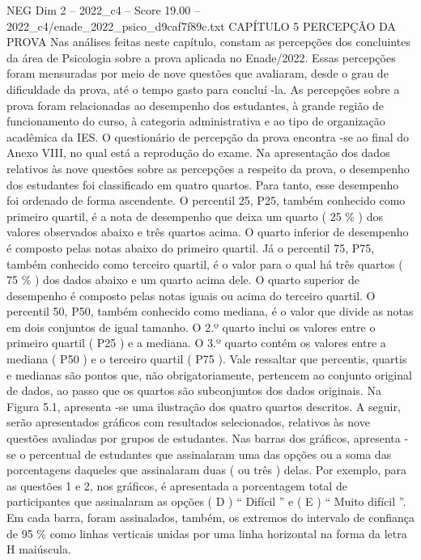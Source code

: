\begin{textsample}{NEG Dim 2 – 2022\_c4 – Score 19.00 – 2022\_c4/enade\_2022\_psico\_d9caf7f89c.txt}  \label{ex:f2_neg_409}
CAPÍTULO 5 PERCEPÇÃO DA PROVA Nas análises feitas neste capítulo, constam as percepções dos concluintes da área de Psicologia sobre a prova aplicada no Enade/2022.
Essas percepções foram mensuradas por meio de nove questões que avaliaram, desde o grau de dificuldade da prova, até o tempo gasto para concluí -la.
As percepções sobre a prova foram relacionadas ao desempenho dos estudantes, à grande região de funcionamento do curso, à categoria administrativa e ao tipo de organização acadêmica da IES.
O questionário de percepção da prova encontra -se ao final do Anexo VIII, no qual está a reprodução do exame.
Na apresentação dos dados relativos às nove questões sobre as percepções a respeito da prova, o desempenho dos estudantes foi classificado em quatro quartos.
Para tanto, esse desempenho foi ordenado de forma ascendente.
O percentil 25, P25, também conhecido como primeiro quartil, é a nota de desempenho que deixa um quarto ( 25 \% ) dos valores observados abaixo e três quartos acima.
O quarto inferior de desempenho é composto pelas notas abaixo do primeiro quartil.
Já o percentil 75, P75, também conhecido como terceiro quartil, é o valor para o qual há três quartos ( 75 \% ) dos dados abaixo e um quarto acima dele.
O quarto superior de desempenho é composto pelas notas iguais ou acima do terceiro quartil.
O percentil 50, P50, também conhecido como mediana, é o valor que divide as notas em dois conjuntos de igual tamanho.
O 2.º quarto inclui os valores entre o primeiro quartil ( P25 ) e a mediana.
O 3.º quarto contém os valores entre a mediana ( P50 ) e o terceiro quartil ( P75 ).
Vale ressaltar que percentis, quartis e medianas são pontos que, não obrigatoriamente, pertencem ao conjunto original de dados, ao passo que os quartos são subconjuntos dos dados originais.
Na Figura 5.1, apresenta -se uma ilustração dos quatro quartos descritos.
A seguir, serão apresentados gráficos com resultados selecionados, relativos às nove questões avaliadas por grupos de estudantes.
Nas barras dos gráficos, apresenta -se o percentual de estudantes que assinalaram uma das opções ou a soma das porcentagens daqueles que assinalaram duas ( ou três ) delas.
Por exemplo, para as questões 1 e 2, nos gráficos, é apresentada a porcentagem total de participantes que assinalaram as opções ( D ) “ Difícil ” e ( E ) “ Muito difícil ”.
Em cada barra, foram assinalados, também, os extremos do intervalo de confiança de 95 \% como linhas verticais unidas por uma linha horizontal na forma da letra H maiúscula.

\end{textsample}
